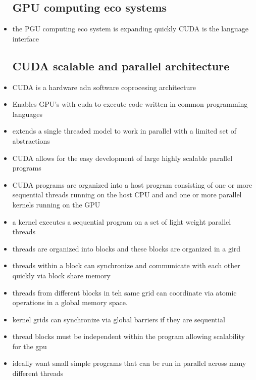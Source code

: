 \documentclass{article}
\begin{document}
\begin{itemize}
\subsection*{GPU computing eco systems}
\item the PGU computing eco system is expanding quickly CUDA is the language interface
\subsection*{CUDA scalable and parallel architecture}
\item CUDA is a hardware adn software coprocesing architecture
\item Enables GPU's with cuda to execute code written in common programming languages 
\item extends a single threaded model to work in parallel with a limited set of abstractions 
\item CUDA allows for the easy development of large highly scalable parallel programs 
\item CUDA programs are organized into a host program consisting of one or more sequential threads running on the host CPU and and one or more parallel kernels running on the GPU 
\item a kernel executes a sequential program on a set of light weight parallel threads 
\item threads are organized into blocks and these blocks are organized in a gird 
\item threads within a block can synchronize and communicate with each other quickly via block share memory
\item threads from different blocks in teh same grid can coordinate via atomic operations in a global memory space.      
\item kernel grids can synchronize via global barriers if they are sequential
\item thread blocks must be independent within the program allowing scalability for the gpu 
\item ideally want small simple programs that can be run in parallel across many different threads


\end{itemize}
\end{document}
